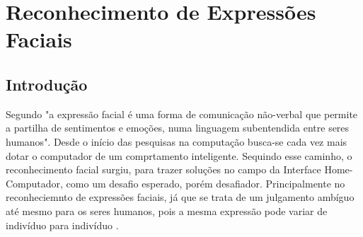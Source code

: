\chapter{Reconhecimento de Expressões Faciais}

\section{Introdução}
Segundo  "a expressão facial é uma forma de comunicação não-verbal que permite a partilha de
sentimentos e emoções, numa linguagem subentendida entre seres humanos". Desde o início das pesquisas na computação busca-se cada vez mais dotar o computador de um comprtamento inteligente. Sequindo esse caminho, o reconhecimento facial surgiu,  para trazer soluções no campo da Interface Home- Computador, como um desafio esperado, porém desafiador. Principalmente no reconheciemnto de expressões faciais, já que se trata de um julgamento ambíguo até mesmo para os seres humanos, pois a mesma expressão pode variar de indivíduo para indivíduo \cite{FernandoGil} \cite{Elizabeth}.

